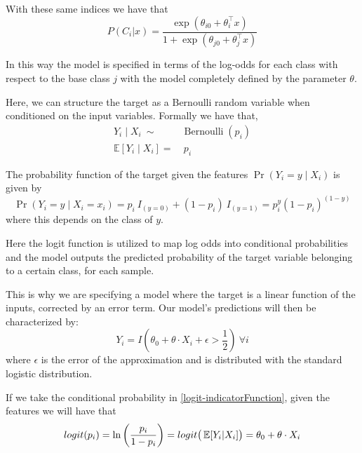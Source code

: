 With these same indices we have that
\begin{equation} P(C_i|x) = \frac{\exp(\theta_{i0} + \theta_i^\intercal x)}{1 + \exp(\theta_{j0} + \theta_j^\intercal x)}
\end{equation}

In this way the model is specified in terms of the log-odds for each class with respect to the base class $j$ with the model completely defined by the parameter $\theta$.

Here, we can structure the target as a Bernoulli random variable when conditioned on the input variables.
Formally we have that,
\begin{equation}
\begin{split}
Y_i \mid X_i \ \sim & \operatorname{Bernoulli}(p_i) \\
\mathbb{E}[Y_i \mid X_i ] = & \ p_i
\end{split}
\end{equation}


The probability function of the target given the features $\Pr(Y_i=y\mid X_i)$ is given by
\begin{equation}
\Pr(Y_i=y \mid X_i = x_i) = p_i \ I_{(y=0)} + (1-p_i) \ I_{(y=1)}  = p_i^{y} {(1-p_i)}^{(1-y)}
\label{logit-probabilityDensity}
\end{equation}
where this depends on the class of $y$.

Here the logit function is utilized to map log odds into conditional probabilities and the model outputs the predicted probability of the target variable belonging to a certain class, for each sample.

This is why we are specifying a model where the target is a linear function of the inputs, corrected by an error term.
Our model's predictions will then be characterized by:
\begin{equation}
Y_i = I(\theta_0 + \theta \cdot X_i + \epsilon > \frac{1}{2}) \ \forall i
\label{logit-indicatorFunction}
\end{equation}
where $\epsilon$ is the error of the approximation and is distributed with the standard logistic distribution.

If we take the conditional probability in \cref{logit-indicatorFunction}, given the features we will have that
\begin{equation}
logit(p_i)= \ln \left(\frac{p_i}{1-p_i} \right) = logit\big( \operatorname{\mathbb{E}}[Y_i| X_i] \big) = \theta_0 + \theta \cdot X_i
\end{equation}

